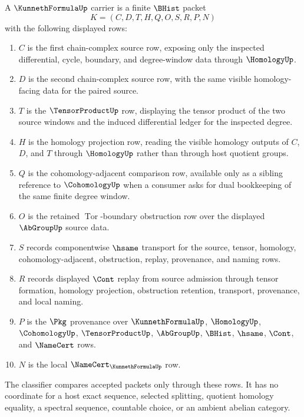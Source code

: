\begin{definition}
\label{def:kunneth-formula-carrier}
A $\KunnethFormulaUp$ carrier is a finite $\BHist$ packet
$$
K=(C,D,T,H,Q,O,S,R,P,N)
$$
with the following displayed rows:
\begin{enumerate}
\item $C$ is the first chain-complex source row, exposing only the inspected differential, cycle, boundary, and degree-window data through $\HomologyUp$.
\item $D$ is the second chain-complex source row, with the same visible homology-facing data for the paired source.
\item $T$ is the $\TensorProductUp$ row, displaying the tensor product of the two source windows and the induced differential ledger for the inspected degree.
\item $H$ is the homology projection row, reading the visible homology outputs of $C$, $D$, and $T$ through $\HomologyUp$ rather than through host quotient groups.
\item $Q$ is the cohomology-adjacent comparison row, available only as a sibling reference to $\CohomologyUp$ when a consumer asks for dual bookkeeping of the same finite degree window.
\item $O$ is the retained $\operatorname{Tor}$-boundary obstruction row over the displayed $\AbGroupUp$ source data.
\item $S$ records componentwise $\hsame$ transport for the source, tensor, homology, cohomology-adjacent, obstruction, replay, provenance, and naming rows.
\item $R$ records displayed $\Cont$ replay from source admission through tensor formation, homology projection, obstruction retention, transport, provenance, and local naming.
\item $P$ is the $\Pkg$ provenance over $\KunnethFormulaUp$, $\HomologyUp$, $\CohomologyUp$, $\TensorProductUp$, $\AbGroupUp$, $\BHist$, $\hsame$, $\Cont$, and $\NameCert$ rows.
\item $N$ is the local $\NameCert_{\KunnethFormulaUp}$ row.
\end{enumerate}
The classifier compares accepted packets only through these rows. It has no coordinate for a host exact sequence, selected splitting, quotient homology equality, a spectral sequence, countable choice, or an ambient abelian category.
\end{definition}

